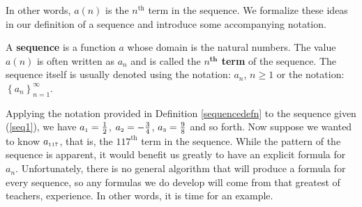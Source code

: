 \setlength{\extrarowheight}{0pt}

In other words, $a(n)$ is the $n^{\text{th}}$ term in the sequence.  We formalize these ideas in our definition of a  sequence and introduce some accompanying notation.

\smallskip

\colorbox{ResultColor}{\bbm

\begin{defn} \label{sequencedefn}   A \textbf{sequence} is a function $a$ whose domain is the natural numbers. The value $a(n)$ is often written as $a_{n}$ and is called the   \textbf{\boldmath $n^{\textbf{th}}$ term} of the sequence.  The sequence itself is usually denoted using the notation:  $a_{n}$, $n \geq 1$ or the notation:  $\left\{ a_{n} \right\}_{n = 1}^{\infty}$.


\end{defn}

\ebm}

\smallskip

Applying the notation provided in Definition \ref{sequencedefn} to the sequence given (\ref{seq1}), we have $a_{\mbox{\tiny$1$}} =  \frac{1}{2}$, $a_{\mbox{\tiny$2$}} =  -\frac{3}{4}$, $a_{\mbox{\tiny$3$}} =  \frac{9}{8}$ and so forth. Now suppose we wanted to know $a_{\mbox{\tiny$117$}}$, that is, the $117^{\text{th}}$ term in the sequence. While the pattern of the sequence is apparent, it would benefit us greatly to have an explicit formula for $a_{n}$.  Unfortunately, there is no general algorithm that will produce a formula for every sequence, so any formulas we do  develop will come from that greatest of teachers, experience. In other words, it is time for an example.

